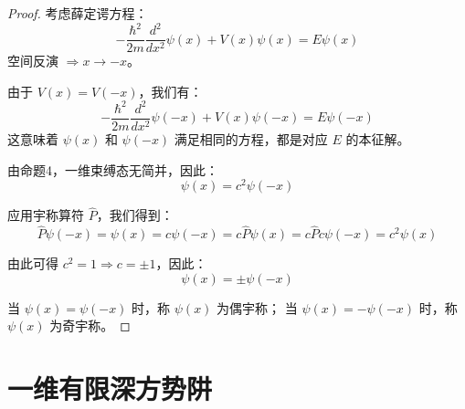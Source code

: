\documentclass[lang=cn,10pt]{elegantbook}
\begin{document}
\begin{proof}
	考虑薛定谔方程：
	\[
	-\frac{\hbar^2}{2m} \frac{d^2}{dx^2} \psi(x) + V(x) \psi(x) = E \psi(x)
	\]
	空间反演 $\Rightarrow x \rightarrow -x$。
	
	由于 $V(x) = V(-x)$，我们有：
	\[
	-\frac{\hbar^2}{2m} \frac{d^2}{dx^2} \psi(-x) + V(x) \psi(-x) = E \psi(-x)
	\]
	这意味着 $\psi(x)$ 和 $\psi(-x)$ 满足相同的方程，都是对应 $E$ 的本征解。
	
	由命题4，一维束缚态无简并，因此：
	\[
	\psi(x) = c^2 \psi(-x)
	\]
	
	应用宇称算符 $\hat{P}$，我们得到：
	\[
	\hat{P} \psi(-x) = \psi(x) = c \psi(-x) = c \hat{P} \psi(x) = c \hat{P} c \psi(-x) = c^2 \psi(x)
	\]
	
	由此可得 $c^2 = 1 \Rightarrow c = \pm 1$，因此：
	\[
	\psi(x) = \pm \psi(-x)
	\]
	
	当 $\psi(x) = \psi(-x)$ 时，称 $\psi(x)$ 为偶宇称；
	当 $\psi(x) = -\psi(-x)$ 时，称 $\psi(x)$ 为奇宇称。
\end{proof}

\section{一维有限深方势阱}
\end{document}
